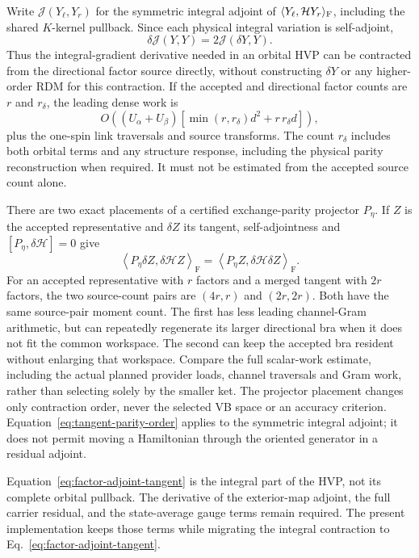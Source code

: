 \documentclass[11pt,a4paper]{article}
\newcommand{\ip}[2]{\left\langle #1,#2\right\rangle_{\mathrm F}}
\begin{document}
Write $\mathcal J(Y_\ell,Y_r)$ for the symmetric integral adjoint of
$\langle Y_\ell,\mathcal H Y_r\rangle_{\rm F}$, including the shared
$K$-kernel pullback. Since each physical integral variation is self-adjoint,
\begin{equation}\label{eq:factor-adjoint-tangent}
 \delta\mathcal J(Y,Y)=2\mathcal J(\delta Y,Y).
\end{equation}
Thus the integral-gradient derivative needed in an orbital HVP can be
contracted from the directional factor source directly, without constructing
$\delta Y$ or any higher-order RDM for this contraction. If the accepted
and directional factor counts are $r$ and $r_\delta$, the leading dense work is
\begin{equation}
 O\left((U_\alpha+U_\beta)
  [\min(r,r_\delta)d^2+r\,r_\delta d]\right),
\end{equation}
plus the one-spin link traversals and source transforms. The count
$r_\delta$ includes both orbital terms and any structure response, including
the physical parity reconstruction when required. It must not be estimated
from the accepted source count alone.

There are two exact placements of a certified exchange-parity projector
$P_\eta$. If $Z$ is the accepted representative and $\delta Z$ its tangent,
self-adjointness and $[P_\eta,\delta\mathcal H]=0$ give
\begin{equation}\label{eq:tangent-parity-order}
 \ip{P_\eta\delta Z}{\delta\mathcal H Z}
 =\ip{P_\eta Z}{\delta\mathcal H\delta Z}.
\end{equation}
For an accepted representative with $r$ factors and a merged tangent with
$2r$ factors, the two source-count pairs are $(4r,r)$ and $(2r,2r)$.
Both have the same source-pair moment count. The first has less leading
channel-Gram arithmetic, but can repeatedly regenerate its larger directional
bra when it does not fit the common workspace. The second can keep the
accepted bra resident without enlarging that workspace. Compare the full
scalar-work estimate, including the actual planned provider loads, channel
traversals and Gram work, rather than selecting solely by the smaller ket.
The projector placement changes only contraction order, never the selected
VB space or an accuracy criterion. Equation~\eqref{eq:tangent-parity-order}
applies to the symmetric integral adjoint; it does not permit moving a
Hamiltonian through the oriented generator in a residual adjoint.

Equation~\eqref{eq:factor-adjoint-tangent} is the integral part of the HVP,
not its complete orbital pullback. The derivative of the exterior-map
adjoint, the full carrier residual, and the state-average gauge terms remain
required. The present implementation keeps those terms while migrating the
integral contraction to Eq.~\eqref{eq:factor-adjoint-tangent}.
\end{document}
